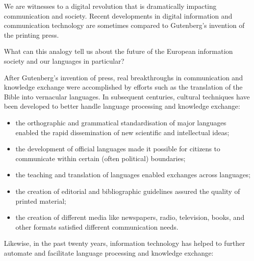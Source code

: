 \begin{multicols}{2}

We are witnesses to a digital revolution that is dramatically impacting communication and society. Recent developments in digital information and communication technology are sometimes compared to Gutenberg’s invention of the printing press. 

What can this analogy tell us about the future of the European information society and our languages in particular?



 After Gutenberg’s invention of press, real breakthroughs in communication and knowledge exchange were accomplished by efforts such as the translation of the Bible into vernacular languages. In subsequent centuries, cultural techniques have been developed to better handle language processing and knowledge exchange:

\begin{itemize}
\item the orthographic and grammatical standardisation of major languages enabled the rapid dissemination of new scientific and intellectual ideas;
\item the development of official languages made it possible for citizens to communicate within certain (often political) boundaries;
\item the teaching and translation of languages enabled exchanges across languages;
\item the creation of editorial and bibliographic guidelines assured the quality of printed material;
\item the creation of different media like newspapers, radio, television, books, and other formats satisfied different communication needs. 
\end{itemize}


Likewise, in the past twenty years, information technology has helped to further automate and facilitate language processing and knowledge exchange:


\end{multicols}
